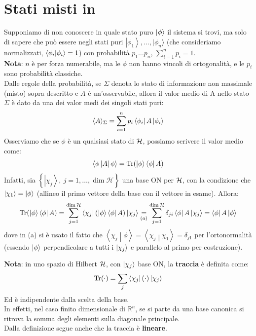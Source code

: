 \documentclass[../../FisicaTeorica.tex]{subfiles}
\begin{document}
\section{Stati misti in \MQ}
Supponiamo di non conoscere in quale stato puro $\ket{\phi}$ il sistema si trovi, ma solo di sapere che può essere negli stati puri $\left|\phi_1\right\rangle,\dots, |\phi_n\rangle $ (che consideriamo normalizzati, $\braket{\phi_i|\phi_i}=1$) con probabilità $p_1\dots p_n$, $\sum_{i=1}^{n}p_i=1$.\\
\textbf{Nota}: $n$ è per forza numerabile, ma le $\phi$ non hanno vincoli di ortogonalità, e le $p_i$ sono probabilità classiche.\\
Dalle regole della probabilità, se $\Sigma$ denota lo stato di informazione non massimale (misto) sopra descritto e $A$ è un'osservabile, allora il valor medio di A nello stato $\Sigma$ è dato da una  dei valor medi dei singoli stati puri:
\[
\langle A \rangle_\Sigma = \sum_{i=1}^n p_i\bra{\phi_i}A\ket{\phi_i}
\]
Osserviamo che se $\phi$ è un qualsiasi stato di $\mathcal{H}$, possiamo scrivere il valor medio come:
\[
\left\langle\phi\left|A\right|\phi\right\rangle
=\operatorname{Tr}(\ket{\phi}\bra{\phi}A)
\]
Infatti, sia $\left\{\left|\chi_j\right\rangle,\
j=1,\ldots,\dim{\mathcal{H}}\right\}$ una base ON per $\mathcal{H}$, con la condizione che $\left|\chi_1\right\rangle=\ket{\phi}$ (allineo il primo vettore della base con il vettore in esame). Allora:
\[
\operatorname{Tr}(\ket{\phi}\bra{\phi}A) = \sum_{j=1}^{\operatorname{dim}\mathcal{H}}\bra{\chi_j}(\ket{\phi}\bra{\phi}A)\ket{\chi_j} \underset{(a)}{=} \sum_{j=1}^{\operatorname{dim}\mathcal{H}}\delta_{ji}\bra{\phi}A\ket{\chi_j} = \bra{\phi}A\ket{\phi}
\]
dove in (a) si è usato il fatto che $\left\langle\chi_j\middle|\phi\right\rangle=\left\langle\chi_j\middle|\chi_1\right\rangle=\delta_{j1}$ per l'ortonormalità (essendo $\ket{\phi}$ perpendicolare a tutti i $\ket{\chi_j}$ e parallelo al primo per costruzione).
\begin{mdframed}[hidealllines=true,backgroundcolor=green!20,innerleftmargin=3pt,innerrightmargin=3pt,leftmargin=-3pt,rightmargin=-3pt]
\textbf{Nota}: in uno spazio di Hilbert\index{Traccia} $\mathcal{H}$, con $\ket{\chi_j}$ base ON, la \textbf{traccia} è definita come:
\[
\operatorname{Tr}(\cdot) = \sum_j \bra{\chi_j} (\cdot) \ket{\chi_j}
\]
Ed è indipendente dalla scelta della base.\\
In effetti, nel caso finito dimensionale di $\mathbb{R}^n$, se si parte da una base canonica si ritrova la somma degli elementi sulla diagonale principale.\\
Dalla definizione segue anche che la traccia è \textbf{lineare}.
\end{mdframed}
\end{document}
